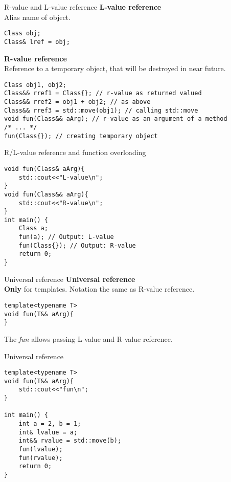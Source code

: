 \documentclass{beamer}
\begin{document}
\begin{frame}[fragile] {R-value and L-value reference}
\textbf{L-value reference}\\
Alias name of object. \\
\begin{lstlisting}[style=customcpp]
Class obj;
Class& lref = obj;
\end{lstlisting}

\textbf{R-value reference}\\
Reference to a temporary object, that will be destroyed in near future. \\
\begin{lstlisting}[style=customcpp]
Class obj1, obj2;
Class&& rref1 = Class{}; // r-value as returned valued
Class&& rref2 = obj1 + obj2; // as above
Class&& rref3 = std::move(obj1); // calling std::move
void fun(Class&& aArg); // r-value as an argument of a method
/* ... */
fun(Class{}); // creating temporary object
\end{lstlisting}


\end{frame}



\begin{frame}[fragile] {R/L-value reference and function overloading}
\begin{lstlisting}[style=customcpp]
void fun(Class& aArg){
	std::cout<<"L-value\n";
}
void fun(Class&& aArg){
	std::cout<<"R-value\n";
}
int main() {
	Class a;
	fun(a); // Output: L-value
	fun(Class{}); // Output: R-value
	return 0;
}
\end{lstlisting}

\end{frame}


\begin{frame}[fragile] {Universal reference}
\textbf{Universal reference}\\
\textbf{Only} for templates. Notation the same as R-value reference.
\begin{lstlisting}[style=customcpp]
template<typename T>
void fun(T&& aArg){
}
\end{lstlisting}
The \textit{fun} allows passing L-value and R-value reference.
\end{frame}

\begin{frame}[fragile] {Universal reference}
\begin{lstlisting}[style=customcpp]
template<typename T>
void fun(T&& aArg){
	std::cout<<"fun\n";
}

int main() {
	int a = 2, b = 1;
	int& lvalue = a;
	int&& rvalue = std::move(b);
	fun(lvalue);
	fun(rvalue);
	return 0;
}

\end{lstlisting}
\end{frame}
\end{document}

